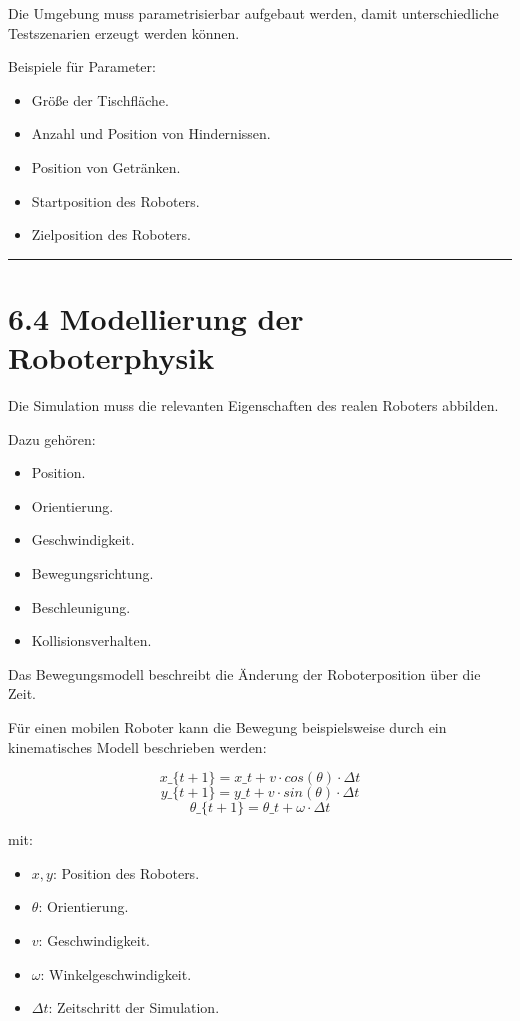 \documentclass[
  a4paper,
  12pt,
  DIV=12,        %
  parskip=half,  %
  headings=small %
]{scrartcl}
\theoremstyle{definition}
\providecommand{\tightlist}{%
  \setlength{\itemsep}{0pt}\setlength{\parskip}{0pt}}
\theoremstyle{definition}
\providecommand{\tightlist}{%
  \setlength{\itemsep}{0pt}\setlength{\parskip}{0pt}}
\begin{document}
Die Umgebung muss parametrisierbar aufgebaut werden, damit
unterschiedliche Testszenarien erzeugt werden können.

Beispiele für Parameter:

\begin{itemize}
\tightlist
\item
  Größe der Tischfläche.
\item
  Anzahl und Position von Hindernissen.
\item
  Position von Getränken.
\item
  Startposition des Roboters.
\item
  Zielposition des Roboters.
\end{itemize}

\begin{center}\rule{0.5\linewidth}{0.5pt}\end{center}

\section{6.4 Modellierung der
Roboterphysik}\label{modellierung-der-roboterphysik}

Die Simulation muss die relevanten Eigenschaften des realen Roboters
abbilden.

Dazu gehören:

\begin{itemize}
\tightlist
\item
  Position.
\item
  Orientierung.
\item
  Geschwindigkeit.
\item
  Bewegungsrichtung.
\item
  Beschleunigung.
\item
  Kollisionsverhalten.
\end{itemize}

Das Bewegungsmodell beschreibt die Änderung der Roboterposition über die
Zeit.

Für einen mobilen Roboter kann die Bewegung beispielsweise durch ein
kinematisches Modell beschrieben werden:

\[ x\_\{t+1\}=x\_t+v \cdot cos(\theta)\cdot \Delta t \]
\[ y\_\{t+1\}=y\_t+v \cdot sin(\theta)\cdot \Delta t\]
\[ \theta\_\{t+1\}=\theta\_t+\omega \cdot \Delta t\]

mit:

\begin{itemize}
\tightlist
\item
  \(x,y\): Position des Roboters.
\item
  \(\theta\): Orientierung.
\item
  \(v\): Geschwindigkeit.
\item
  \(\omega\): Winkelgeschwindigkeit.
\item
  \(\Delta t\): Zeitschritt der Simulation.
\end{itemize}
\end{document}
